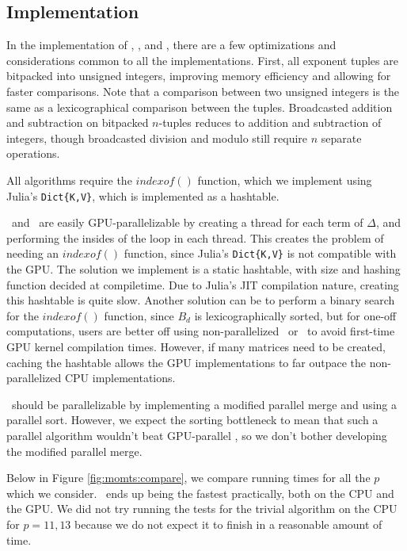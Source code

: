 \subsection{Implementation}

In the implementation of \triv, \merge, and \wicsalg, there are a 
few optimizations and considerations common to all the implementations.
First, all exponent tuples are bitpacked into 
unsigned integers, improving memory efficiency 
and allowing for faster comparisons.
Note that a comparison between two unsigned integers 
is the same as a lexicographical comparison between the tuples.
Broadcasted addition and subtraction on bitpacked 
$n$-tuples reduces to addition and subtraction of 
integers, though broadcasted division and modulo still 
require $n$ separate operations.

All algorithms require the $indexof()$ function, 
which we implement using Julia's \texttt{Dict\{K,V\}}, 
which is implemented as a hashtable.

\triv ~and \wicsalg ~are easily GPU-parallelizable by creating 
a thread for each term of $\Delta$, and performing the insides of the loop in each thread.
This creates the problem of needing an $indexof()$ function, 
since Julia's \texttt{Dict\{K,V\}} is not compatible with the GPU.
The solution we implement is a static hashtable, with size 
and hashing function decided at compiletime.
Due to Julia's JIT compilation nature, creating this 
hashtable is quite slow.
Another solution can be to perform a binary search 
for the $indexof()$ function, since $B_d$ is lexicographically 
sorted, but for one-off computations, users are better 
off using non-parallelized \merge ~or \wicsalg ~to avoid 
first-time GPU kernel compilation times.
However, if many matrices need to be created, caching 
the hashtable allows the GPU implementations to far outpace 
the non-parallelized CPU implementations.

\merge ~should be parallelizable by implementing a modified parallel merge and using a parallel sort. 
However, we expect the sorting bottleneck to mean that such a parallel algorithm wouldn't beat GPU-parallel \wicsalg,
so we don't bother developing the modified parallel merge.

Below in Figure \ref{fig:momts:compare}, we compare running times 
for all the \(p\) which we consider. 
\wicsalg \, ends up being the fastest practically, 
both on the CPU and the GPU.
We did not try running the tests for the 
trivial algorithm on the 
CPU for \(p=11,13\) because we do not expect 
it to finish in a reasonable
amount of time.

